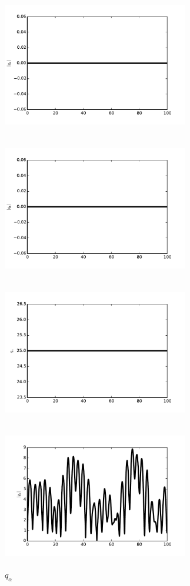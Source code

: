 \documentclass[12pt,twoside]{article}
\begin{document}
\begin{figure}[ht]
\centering
\begin{minipage}[b]{0.45\linewidth}
\includegraphics[width=3.2in,height=2.5in]{qa_nowave.pdf}
\caption{$q_\alpha$}
\includegraphics[width=3.2in,height=2.5in]{qb_nowave.pdf}
\caption{$q_\beta$}
\includegraphics[width=3.2in,height=2.5in]{qg_nowave.pdf}
\caption{$q_\gamma$}

\caption{$\epsilon=0.05 ,\  t=100$, $with\ no \ waves \ in\ the\ initial\ conditions$}\end{minipage}
\quad
\begin{minipage}[b]{0.45\linewidth}

\includegraphics[width=3.2in,height=2.5in]{qa_wave.pdf}
\caption{$q_\alpha$}


\end{minipage}
\end{figure}
\end{document}
